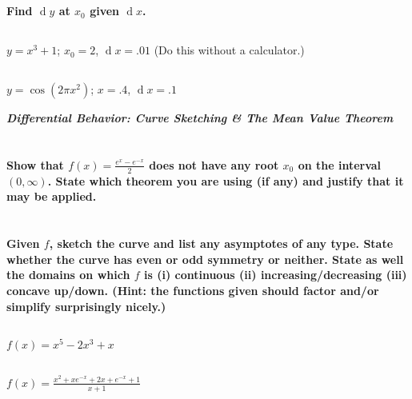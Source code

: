 \documentclass[english]{article}
\renewcommand{\d}[1]{\ensuremath{\operatorname{d}\!{#1}}}
\newcommand{\prob}[1]{\setcounter{section}{#1-1}\section{}}
\newcommand{\prt}[1]{\setcounter{subsection}{#1-1}\subsection{}}
\theoremstyle{remark}
\theoremstyle{definition}
\newcommand{\ild}[1]{\displaystyle{#1}}
\begin{document}
		\prob{7} \textbf{Find $\d y$ at $x_0$ given $\d x$.}
		\prt{1} $y=x^3+1$; $x_0=2$, $\d x=.01$ (Do this without a calculator.)\vspace{2in}
		\prt{2} $y=\cos{(2\pi x^2)}$; $x=.4$, $\d x=.1$
\newpage
		\begin{center}
			{\Large\textbf{\emph{Differential Behavior: Curve Sketching \& The Mean Value Theorem}}}\end{center}
			\prob{8} \textbf{Show that $f(x)=\frac{e^x-e^{-x}}{2}$ does not have any root $x_0$ on the interval $(0,\infty)$. State which theorem you are using (if any) and justify that it may be applied.}\vspace{2in}
			\prob{9}\textbf{Given $f$, sketch the curve and list any asymptotes of any type. State whether the curve has even or odd symmetry or neither. State as well the domains on which $f$ is (i) continuous (ii) increasing/decreasing (iii) concave up/down. (Hint: the functions given should factor and/or simplify surprisingly nicely.)}\prt{1}
			$\ild{f(x)=x^5-2x^3+x}$ \vspace{2in}
			\prt{2} $\ild{f(x)=\frac{x^2+xe^{-x}+2x+e^{-x}+1}{x+1}}$\newpage
			
\end{document}
